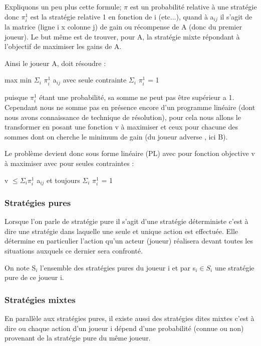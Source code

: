 \documentclass[a4paper, 12pt, twoside]{article}
\begin{document}
Expliquons un peu plus cette formule; $ \pi $ est un probabilité relative à une stratégie donc 
$\pi_{i}^{1}$ est la stratégie relative 1 en fonction de i (etc...), quand à a$ _{ij} $ il s'agit de la matrice (ligne \textsf{i} x colonne \textsf{j}) de gain ou récompense de A (donc du premier joueur).  Le but même est de trouver, pour A, la stratégie mixte répondant à l'objectif de maximiser les gains de A. \newline

Ainsi le joueur A, doit résoudre :
\begin{center}
max min  $ \Sigma_{i}$ $\pi_{i}^{1}$ a$ _{ij} $ \hspace{0.2 cm} avec seule contrainte \hspace{0.2 cm} $ \Sigma_{i}$ $\pi_{i}^{1}$ = 1
\end{center}
puisque $\pi_{i}^{1}$ étant une probabilité, sa somme ne peut pas être supérieur a 1. Cependant nous ne somme pas en présence encore d'un programme linéaire (dont nous avons connaissance de technique de résolution), pour cela nous allons le transformer  en posant une fonction  \textsf{v} à maximiser et ceux pour chacune des sommes dont on cherche le minimum de gain (du joueur adverse , ici B). \newline 

Le problème devient donc sous forme linéaire (PL) avec pour fonction objective \textsf{v} à maximiser avec pour seules contraintes : 
\begin{center}
v $ \leq  \Sigma_{i} \pi_{i}^{1}$ a$ _{ij} $ \hspace{0.2 cm} et toujours \hspace{0.2 cm} $ \Sigma_{i}$ $\pi_{i}^{1}$ = 1
\end{center}

\subsubsection{Stratégies pures}
Lorsque l'on parle de stratégie pure il s'agit d'une stratégie déterministe c'est à dire une stratégie dans laquelle une seule et unique action est effectuée. Elle détermine en particulier l'action qu'un acteur (joueur) réalisera devant toutes les situations auxquels ce dernier sera confronté. \newline

On note S$_{i}$ l'ensemble des stratégies pures du joueur i et par s$_{i} \in S_{i}$ une stratégie pure de ce joueur i. 
\subsubsection{Stratégies mixtes}
En parallèle aux stratégies pures, il existe aussi des stratégies dites mixtes c'est à dire ou chaque action d'un joueur i  dépend d'une probabilité (connue ou non) provenant de la stratégie pure du même joueur. \newline
\end{document}
